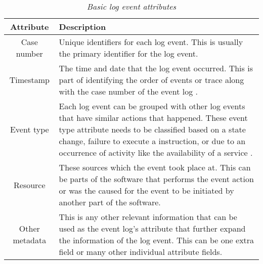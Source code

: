 \begin{table}[!htb]
	\centering
	\caption[Basic log event attributes]
	{\textit{Basic log event attributes \cite{Bekeneva2020}}}
	\label{tbl:CH1_Log_Basic_Attributes}
	\begin{tabularx}{\textwidth}{|c|X|}
		\hline \textbf{Attribute} & \textbf{Description} \\
		\hline Case number & Unique identifiers for each log event. This is usually the primary identifier for the log event. \\
		\hline Timestamp & The time and date that the log event occurred. This is part of identifying the order of events or trace along with the case number of the event log \cite{Kherbouche2017}. \\
		\hline Event type & Each log event can be grouped with other log events that have similar actions that happened. These event type attribute needs to be classified based on a state change, failure to execute a instruction, or due to an occurrence of activity like the availability of a service \cite{Fedaghi2010}. \\
		\hline Resource & These sources which the event took place at. This can be parts of the software that performs the event action or was the caused for the event to be initiated by another part of the software. \\
		\hline Other metadata & This is any other relevant information that can be used as the event log's attribute that further expand the information of the log event. This can be one extra field or many other individual attribute fields.\\
		\hline
	\end{tabularx}
\end{table}


